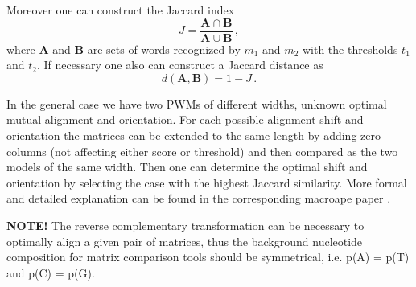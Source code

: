 Moreover one can construct the Jaccard index 
$$J = \frac{\mathbf{A}\cap \mathbf{B}}{\mathbf{A}\cup \mathbf{B}}\,, $$
where $\mathbf{A}$ and $\mathbf{B}$ are 
sets of words recognized by $m_1$ and $m_2$ with the thresholds $t_1$ and $t_2$. If necessary one also can 
construct a Jaccard distance as $$d(\mathbf{A},\mathbf{B}) = 1 - J\,.$$

In the general case we have two PWMs of different widths, unknown optimal mutual 
alignment and orientation. For each possible alignment shift and orientation the matrices can be 
extended to the same length by adding zero-columns (not affecting either score or threshold) 
and then compared as the two models of the same width. Then one can determine the optimal 
shift and orientation by selecting the case with the highest Jaccard similarity. More formal and 
detailed explanation can be found in the corresponding macroape paper \cite{MACROAPE}.

\textbf{NOTE!} The reverse complementary transformation can be necessary to optimally align a given pair of matrices,
thus the background nucleotide composition for matrix comparison tools should be symmetrical, i.e. p(A) = p(T) and p(C) = p(G).
